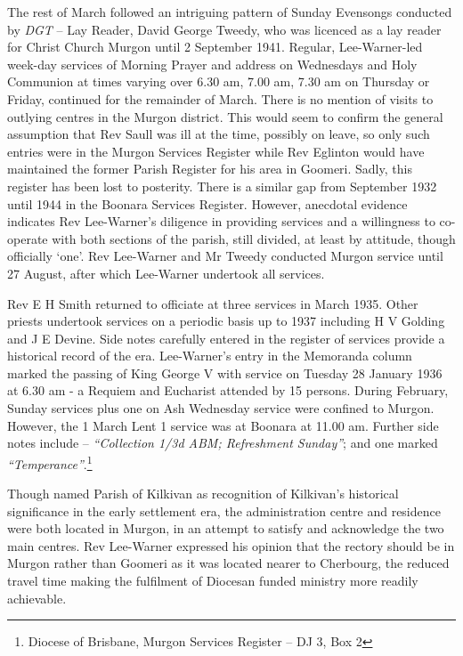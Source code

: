 The rest of March followed an intriguing pattern of Sunday Evensongs conducted by \emph{DGT} -- Lay Reader, David George Tweedy, who was licenced as a lay reader for Christ Church Murgon until 2 September 1941. Regular, Lee-Warner-led week-day services of Morning Prayer and address on Wednesdays and Holy Communion at times varying over 6.30 am, 7.00 am, 7.30 am on Thursday or Friday, continued for the remainder of March. There is no mention of visits to outlying centres in the Murgon district. This would seem to confirm the general assumption that Rev Saull was ill at the time, possibly on leave, so only such entries were in the Murgon Services Register while Rev Eglinton would have maintained the former Parish Register for his area in Goomeri. Sadly, this register has been lost to posterity. There is a similar gap from September 1932 until 1944 in the Boonara Services Register. However, anecdotal evidence indicates Rev Lee-Warner's diligence in providing services and a willingness to co-operate with both sections of the parish, still divided, at least by attitude, though officially `one'. Rev Lee-Warner and Mr Tweedy conducted Murgon service until 27 August, after which Lee-Warner undertook all services.



Rev E H Smith returned to officiate at three services in March 1935. Other priests undertook services on a periodic basis up to 1937 including H V Golding and J E Devine. Side notes carefully entered in the register of services provide a historical record of the era. Lee-Warner's entry in the Memoranda column marked the passing of King George V with service on Tuesday 28 January 1936 at 6.30 am - a Requiem and Eucharist attended by 15 persons. During February, Sunday services plus one on Ash Wednesday service were confined to Murgon. However, the 1 March Lent 1 service was at Boonara at 11.00 am. Further side notes include -- \emph{``Collection 1/3d ABM; Refreshment Sunday''}; and one marked \emph{``Temperance''}.\footnote{Diocese of Brisbane, Murgon Services Register -- DJ 3, Box 2}


Though named Parish of Kilkivan as recognition of Kilkivan's historical significance in the early settlement era, the administration centre and residence were both located in Murgon, in an attempt to satisfy and acknowledge the two main centres. Rev Lee-Warner expressed his opinion that the rectory should be in Murgon rather than Goomeri as it was located nearer to Cherbourg, the reduced travel time making the fulfilment of Diocesan funded ministry more readily achievable.



